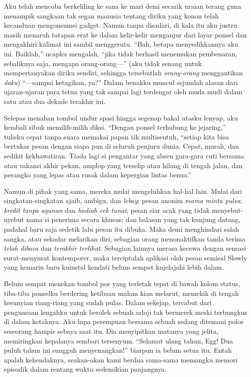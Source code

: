 \documentclass[smalldemyvopaper,11pt,twoside,onecolumn,openright,extrafontsizes]{memoir}
\begin{document}

Aku telah mencoba berkeliling ke sana ke mari demi secarik uraian terang guna menampik sangkaan tak segan manusia tentang diriku yang konon telah kecanduan mengonsumsi gadget. Namun tanpa disadari, di kala itu aku justru masih menaruh tatapan erat ke dalam kelir-kelir menganjur dari layar ponsel dan mengakhiri kalimat ini sambil menggerutu. ``Bah, betapa menyedihkannya aku ini. Baiklah,'' ucapku mengalah, ``jika tidak berhasil menemukan pembenaran, sebaliknya saja, mengapa orang-orang---'' (aku tidak senang untuk mempertanyakan diriku sendiri, sehingga tersebutlah \textit{orang-orang} menggantikan \textit{daku}) ``---sampai ketagihan, ya?'' Dalam benakku muncul sejumlah alasan dari ujaran-ujaran para tetua yang tak sampai lagi terdengar oleh muda mudi dalam satu atau dua dekade terakhir ini.


Selepas menahan tombol undur spasi hingga segenap bakal utasku lenyap, aku kembali sibuk memilih-milih diksi. ``Dengan ponsel terhubung ke jejaring,'' tulisku cepat tanpa suara memakai papan tik multisentuh, ``setiap kita bisa bertukar pesan dengan siapa pun di seluruh penjuru dunia. Cepat, murah, dan sedikit kekhawatiran. Tiada lagi si pengantar yang absen gara-gara cuti bersama atau vakansi akhir pekan, amplop yang terselip atau hilang di tengah jalan, dan perangko yang lepas atau rusak dalam kepergian lintas benua.''


Namun di pihak yang sama, mereka mulai mengeluhkan hal-hal lain. Mulai dari singkatan-singkatan ajaib, ambigu, dan \textit{lebay}; pesan anonim \textit{mama minta pulsa}; \textit{kredit tanpa agunan} dan \textit{hadiah cek tunai}; pesan siar acak yang tidak menyebut-nyebut nama si penerima secara khusus; dan balasan yang tak kunjung datang, padahal baru saja sedetik lalu pesan itu dibuka. Maka demi menghindari salah sangka, atau sekadar melarikan diri, sebagian orang menonaktifkan tanda terima \textit{telah dibaca} dan \textit{terakhir terlihat}. Sebagian lainnya merasa kecewa dengan sensasi surat-menyurat kontemporer, maka terciptalah aplikasi olah pesan semisal Slowly yang kemarin baru kuinstal kendati belum sempat kujelajahi lebih dalam.


Belum sempat menekan tombol pos yang terletak tepat di bawah kolom status, tiba-tiba ponselku berdering ketibaan malam kian melarut, memekik di tengah kesunyian riang-riang yang sudah pulas. Dalam sekejap, tercabut dari penguasaan lengahku untuk beroleh sebuah arloji tak bermerek meski terbungkus di dalam kotaknya. Aku lupa perempuan bersama sebuah sedang ditemani polos seseorang hampir sebaya saat itu. Dia menyipitkan matanya yang jelita, memiringkan kepalanya sembari tersenyum. ``Selamat ulang tahun, Egg! Dua puluh tahun ini sungguh menyenangkan!'' biarpun ia belum setua itu. Entah apalah kehendaknya, seakan-akan kami berdua sama-sama memangku memori episodik dalam rentang waktu sedemikian panjangnya.
\end{document}
